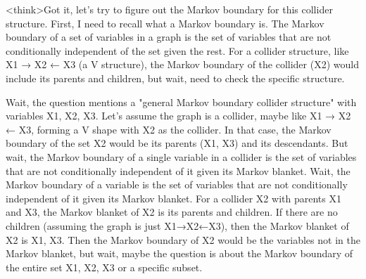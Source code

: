 <think>Got it, let's try to figure out the Markov boundary for this collider structure. First, I need to recall what a Markov boundary is. The Markov boundary of a set of variables in a graph is the set of variables that are not conditionally independent of the set given the rest. For a collider structure, like X1 → X2 ← X3 (a V structure), the Markov boundary of the collider (X2) would include its parents and children, but wait, need to check the specific structure.

Wait, the question mentions a "general Markov boundary collider structure" with variables X1, X2, X3. Let's assume the graph is a collider, maybe like X1 → X2 ← X3, forming a V shape with X2 as the collider. In that case, the Markov boundary of the set {X2} would be its parents (X1, X3) and its descendants. But wait, the Markov boundary of a single variable in a collider is the set of variables that are not conditionally independent of it given its Markov blanket. Wait, the Markov boundary of a variable is the set of variables that are not conditionally independent of it given its Markov blanket. For a collider X2 with parents X1 and X3, the Markov blanket of X2 is its parents and children. If there are no children (assuming the graph is just X1→X2←X3), then the Markov blanket of X2 is {X1, X3}. Then the Markov boundary of X2 would be the variables not in the Markov blanket, but wait, maybe the question is about the Markov boundary of the entire set {X1, X2, X3} or a specific subset.

